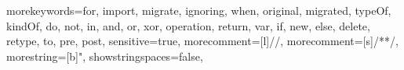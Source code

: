 {morekeywords={for, import, migrate, ignoring, when, original, migrated, typeOf, kindOf, do, not, in, and, or, xor, operation, return, var, if, new, else, delete, retype, to, pre, post},
sensitive=true,
morecomment=[l]{//},
morecomment=[s]{/*}{*/},
morestring=[b]",
showstringspaces=false,
}